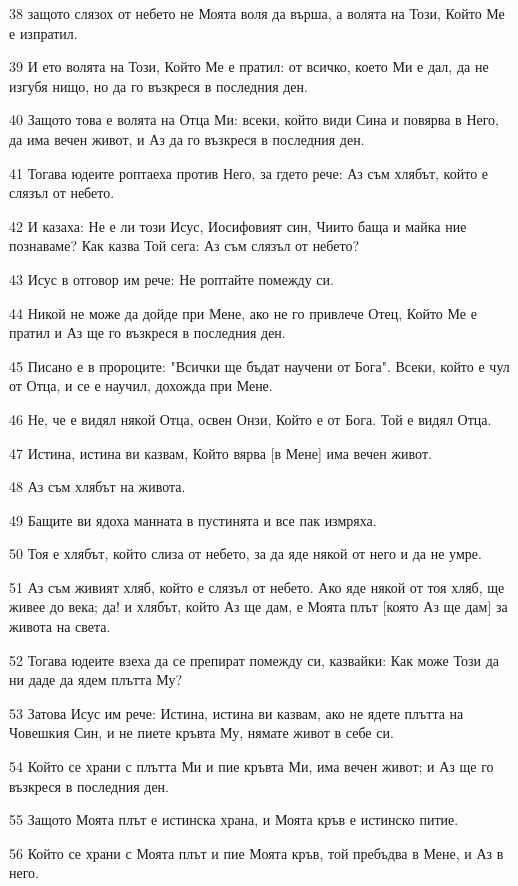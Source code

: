 \par 38 защото слязох от небето не Моята воля да върша, а волята на Този, Който Ме е изпратил.
\par 39 И ето волята на Този, Който Ме е пратил: от всичко, което Ми е дал, да не изгубя нищо, но да го възкреся в последния ден.
\par 40 Защото това е волята на Отца Ми: всеки, който види Сина и повярва в Него, да има вечен живот, и Аз да го възкреся в последния ден.
\par 41 Тогава юдеите роптаеха против Него, за гдето рече: Аз съм хлябът, който е слязъл от небето.
\par 42 И казаха: Не е ли този Исус, Иосифовият син, Чиито баща и майка ние познаваме? Как казва Той сега: Аз съм слязъл от небето?
\par 43 Исус в отговор им рече: Не роптайте помежду си.
\par 44 Никой не може да дойде при Мене, ако не го привлече Отец, Който Ме е пратил и Аз ще го възкреся в последния ден.
\par 45 Писано е в пророците: "Всички ще бъдат научени от Бога". Всеки, който е чул от Отца, и се е научил, дохожда при Мене.
\par 46 Не, че е видял някой Отца, освен Онзи, Който е от Бога. Той е видял Отца.
\par 47 Истина, истина ви казвам, Който вярва [в Мене] има вечен живот.
\par 48 Аз съм хлябът на живота.
\par 49 Бащите ви ядоха манната в пустинята и все пак измряха.
\par 50 Тоя е хлябът, който слиза от небето, за да яде някой от него и да не умре.
\par 51 Аз съм живият хляб, който е слязъл от небето. Ако яде някой от тоя хляб, ще живее до века; да! и хлябът, който Аз ще дам, е Моята плът [която Аз ще дам] за живота на света.
\par 52 Тогава юдеите взеха да се препират помежду си, казвайки: Как може Този да ни даде да ядем плътта Му?
\par 53 Затова Исус им рече: Истина, истина ви казвам, ако не ядете плътта на Човешкия Син, и не пиете кръвта Му, нямате живот в себе си.
\par 54 Който се храни с плътта Ми и пие кръвта Ми, има вечен живот; и Аз ще го възкреся в последния ден.
\par 55 Защото Моята плът е истинска храна, и Моята кръв е истинско питие.
\par 56 Който се храни с Моята плът и пие Моята кръв, той пребъдва в Мене, и Аз в него.
